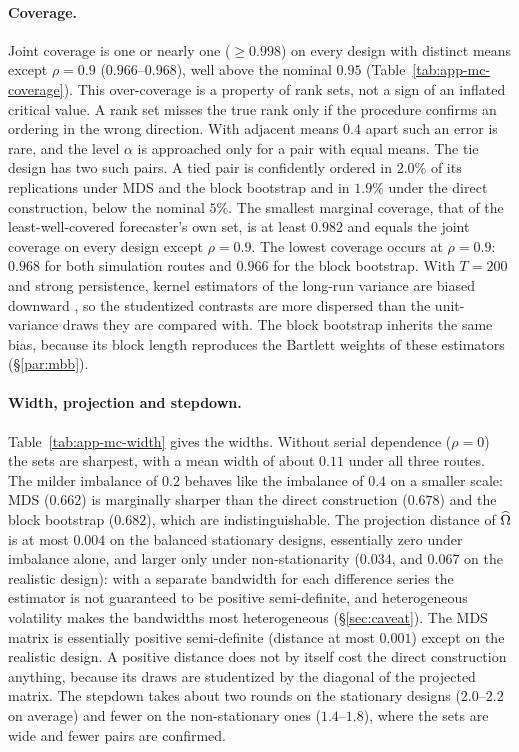 \begin{appendix}
\paragraph{Coverage.} Joint coverage is one or nearly one ($\ge 0.998$) on every design
with distinct means except $\rho=0.9$ ($0.966$--$0.968$), well above the nominal $0.95$
(Table~\ref{tab:app-mc-coverage}). This over-coverage is a property of rank sets, not a
sign of an inflated critical value. A rank set misses the
true rank only if the procedure confirms an ordering in the wrong direction. With
adjacent means $0.4$ apart such an error is rare, and the level $\alpha$ is approached
only for a pair with equal means. The tie design has two such pairs. A tied pair is
confidently ordered in $2.0\%$ of its replications under MDS and the block bootstrap
and in $1.9\%$ under the direct construction, below the nominal $5\%$. The smallest
marginal coverage, that of the least-well-covered forecaster's own set, is at least
$0.982$ and equals the joint coverage on every design except $\rho=0.9$. The lowest
coverage occurs at $\rho=0.9$: $0.968$ for both simulation routes and $0.966$ for the
block bootstrap. With $T=200$ and strong persistence, kernel
estimators of the long-run variance are biased downward \citep{andrews1991}, so the
studentized contrasts are more dispersed than the unit-variance draws they are compared
with. The block bootstrap inherits the same bias, because its block length reproduces
the Bartlett weights of these estimators (\S\ref{par:mbb}).

\paragraph{Width, projection and stepdown.} Table~\ref{tab:app-mc-width} gives the
widths. Without serial dependence ($\rho=0$) the sets are sharpest, with a mean width of
about $0.11$ under all three routes. The milder imbalance of $0.2$ behaves like the
imbalance of $0.4$ on a smaller scale: MDS ($0.662$) is marginally sharper than the
direct construction ($0.678$) and the block bootstrap ($0.682$), which are
indistinguishable. The projection distance of $\widehat{\Omega}$ is at most $0.004$ on the balanced stationary
designs, essentially zero under imbalance alone, and larger only under
non-stationarity ($0.034$, and $0.067$ on the realistic design): with a separate
bandwidth for each difference series the estimator is not guaranteed to be positive
semi-definite, and heterogeneous volatility makes the bandwidths most heterogeneous
(\S\ref{sec:caveat}). The MDS matrix is essentially positive semi-definite (distance at most $0.001$) except
on the realistic design.
A positive distance does not by itself cost the direct construction anything, because
its draws are studentized by the diagonal of the projected matrix. The stepdown takes
about two rounds on the stationary designs ($2.0$--$2.2$ on average) and fewer on the
non-stationary ones ($1.4$--$1.8$), where the sets are wide and fewer pairs are
confirmed.


\end{appendix}

